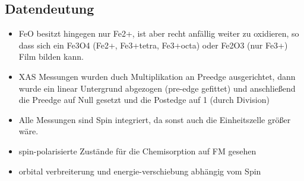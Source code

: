     \subsection{Datendeutung}
        \begin{itemize}
            \item FeO besitzt hingegen nur Fe2+, ist aber recht anfällig weiter zu oxidieren, so dass sich ein Fe3O4 (Fe2+, Fe3+tetra, Fe3+octa) oder Fe2O3 (nur Fe3+) Film bilden kann. 
            \item XAS Messungen wurden duch Multiplikation an Preedge ausgerichtet, dann wurde ein linear Untergrund abgezogen (pre-edge gefittet) und anschließend die Preedge auf Null gesetzt und die Postedge auf 1 (durch Division)
            \item Alle Messungen sind Spin integriert, da sonst auch die Einheitszelle größer wäre.
            \item spin-polarisierte Zustände für die Chemisorption auf FM gesehen \cite{IF_16}
            \item orbital verbreiterung und energie-verschiebung abhängig vom Spin \cite{IF_16}
        \end{itemize}


